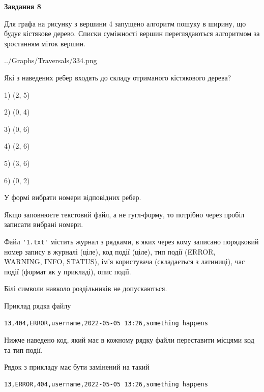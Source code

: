 \documentclass[12pt, ukrainian]{article}
\def\code#1{\Verb!#1!}
\begin{document}
{\begin {large}
{\begin {center}\textbf{Завдання 8}\end {center}}\par
Для графа на рисунку з вершини 4 запущено алгоритм пошуку в ширину, що будує кістякове дерево. Списки суміжності вершин переглядаються алгоритмом за зростанням міток вершин.\par
\begin{center}
	{../Graphs/Traversals/334.png}
\end{center}
\par Які з наведених ребер входять до складу отриманого кістякового дерева?\par
1) (2, 5)\par
2) (0, 4)\par
3) (0, 6)\par
4) (2, 6)\par
5) (3, 6)\par
6) (0, 2)\par
{\vskip 15pt} У формі вибрати номери відповідних ребер.


Якщо заповнюєте текстовий файл, а не гугл-форму, то потрібно через пробіл записа\-ти вибрані номери.\par
\newpage


Файл \code{'1.txt'} містить журнал з рядками, в яких через кому записано поряд\-ко\-вий номер запису в журналі (ціле), код події (ціле), тип події (ERROR,\\ WARNING, INFO, STATUS), ім'я користувача (складається з латиниці), час події (фор\-мат як у прикладі), опис події.

Білі символи навколо роздільників не допускаються.

Приклад рядка файлу



\begin{verbatim}
13,404,ERROR,username,2022-05-05 13:26,something happens
\end{verbatim}


Нижче наведено код, який має в кожному рядку файли переставити місцями код та тип події.

Рядок з прикладу має бути замінений на такий



\begin{verbatim}
13,ERROR,404,username,2022-05-05 13:26,something happens
\end{verbatim}





\end{large}}
\end{document}
